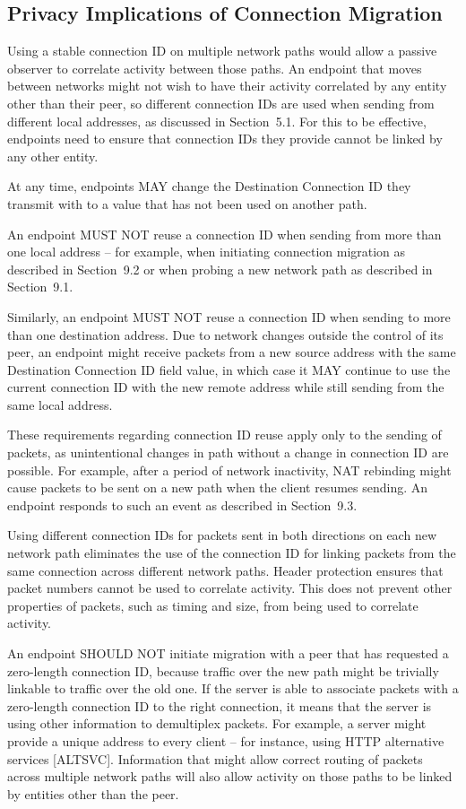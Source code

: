 \documentclass{article}
\begin{document}
\subsection{Privacy Implications of Connection Migration}

Using a stable connection ID on multiple network paths would allow a passive observer to correlate activity between those paths.  An endpoint that moves between networks might not wish to have their activity correlated by any entity other than their peer, so different connection IDs are used when sending from different local addresses, as discussed in Section~5.1.  For this to be effective, endpoints need to ensure that connection IDs they provide cannot be linked by any other entity.

At any time, endpoints MAY change the Destination Connection ID they transmit with to a value that has not been used on another path.

An endpoint MUST NOT reuse a connection ID when sending from more than one local address -- for example, when initiating connection migration as described in Section~9.2 or when probing a new network path as described in Section~9.1.

Similarly, an endpoint MUST NOT reuse a connection ID when sending to more than one destination address.  Due to network changes outside the control of its peer, an endpoint might receive packets from a new source address with the same Destination Connection ID field value, in which case it MAY continue to use the current connection ID with the new remote address while still sending from the same local address.

These requirements regarding connection ID reuse apply only to the sending of packets, as unintentional changes in path without a change in connection ID are possible.  For example, after a period of network inactivity, NAT rebinding might cause packets to be sent on a new path when the client resumes sending.  An endpoint responds to such an event as described in Section~9.3.

Using different connection IDs for packets sent in both directions on each new network path eliminates the use of the connection ID for linking packets from the same connection across different network paths.  Header protection ensures that packet numbers cannot be used to correlate activity.  This does not prevent other properties of packets, such as timing and size, from being used to correlate activity.

An endpoint SHOULD NOT initiate migration with a peer that has requested a zero-length connection ID, because traffic over the new path might be trivially linkable to traffic over the old one.  If the server is able to associate packets with a zero-length connection ID to the right connection, it means that the server is using other information to demultiplex packets.  For example, a server might provide a unique address to every client -- for instance, using HTTP alternative services [ALTSVC].  Information that might allow correct routing of packets across multiple network paths will also allow activity on those paths to be linked by entities other than the peer.
\end{document}
